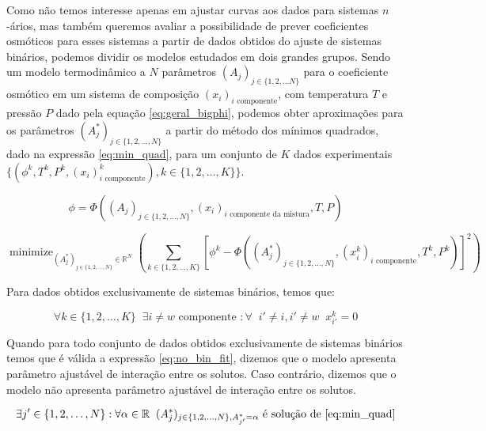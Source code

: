 \documentclass[
	12pt,				%
	openright,
	twoside,
	a4paper,			%
	english,			%
	french,				%
	spanish,			%
	brazil				%
	]{abntex2}
\DeclareMathOperator*{\minimize}{minimize}
\begin{document}
Como não temos interesse apenas em ajustar curvas aos dados para sistemas
$n$-ários, mas também queremos avaliar a possibilidade de prever coeficientes
osmóticos para esses sistemas a partir de dados obtidos do ajuste de sistemas
binários, podemos dividir os modelos estudados em dois grandes grupos. Sendo um
modelo termodinâmico a $N$ parâmetros $(A_j)_{j \in \{1, 2, \ldots N\}}$ para o
coeficiente osmótico em um sistema de composição $(x_i)_\text{$i$ componente}$,
com temperatura $T$ e pressão $P$ dado pela equação \ref{eq:geral_bigphi},
podemos obter aproximações para os parâmetros $(A_j^*)_{j \in \{1, 2, \ldots, N\}}$
a partir do método dos mínimos quadrados, dado na expressão \ref{eq:min_quad},
para um conjunto de $K$ dados experimentais $\{(\phi^k, T^k, P^k,%
	(x_i)^k_\text{$i$ componente}), k \in \{1,2,\ldots,K\}\}$.

\begin{equation}
	\label{eq:geral_bigphi}
	\phi = \Phi((A_j)_{j \in \{1, 2, \ldots, N\}}, (x_i)_\text{$i$ componente da mistura}, T, P)
\end{equation}

\begin{equation}
	\label{eq:min_quad}
	\minimize_{(A_j^*)_{j \in \{1,2,\ldots,N\}} \in \mathbb{R}^N}%
	\left(\sum_{k \in \{1,2,\ldots,K\}}\left[\phi^k - \Phi((A^*_j)_{j%
	\in \{1, 2, \ldots, N\}}, (x^k_i)_\text{$i$ componente},%
	T^k, P^k)\right]^2\right)
\end{equation}

Para dados obtidos exclusivamente de sistemas binários, temos que:

\begin{equation}
	\forall k \in \{1,2,\ldots,K\} \;\; \exists i \neq w%
	\text{ componente } : \forall \;\; i' \neq i, i' \neq w\;\; x^k_{i'} = 0
\end{equation}

Quando para todo conjunto de dados obtidos exclusivamente de sistemas binários
temos que é válida a expressão \ref{eq:no_bin_fit},
dizemos que o modelo apresenta parâmetro ajustável de interação entre os
solutos. Caso contrário, dizemos que o modelo não apresenta parâmetro
ajustável de interação entre os solutos.

\begin{equation}
	\label{eq:no_bin_fit}
	\exists j' \in \{1,2,\ldots,N\} : \forall \alpha \in \mathbb{R}\;\;%
	(A_j^*)_{j \in \{1,2,\ldots,N\}, A_{j'}^* = \alpha}%
	\text{ é solução de \ref{eq:min_quad}}
\end{equation}
\end{document}
